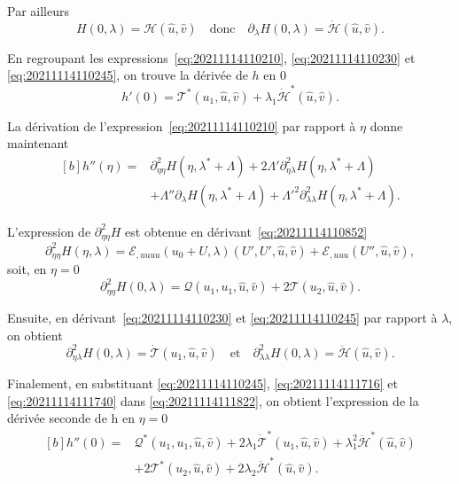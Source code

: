 \documentclass[12pt, final]{amsart}
\begin{document}
Par ailleurs
\begin{equation}
  \label{eq:20211114110245}
  H(0, \lambda)=\mathcal H(\hat{u}, \hat{v})
  \quad\text{donc}\quad
  \partial_\lambda H(0, \lambda)=\dot{\mathcal H}(\hat{u}, \hat{v}).
\end{equation}

En regroupant les expressions~\eqref{eq:20211114110210},
\eqref{eq:20211114110230} et \eqref{eq:20211114110245}, on trouve la dérivée de
\(h\) en 0
\begin{equation}
  h'(0)=\mathcal T^\ast(u_1, \hat{u}, \hat{v})
  +\lambda_1\dot{\mathcal H}^\ast(\hat{u}, \hat{v}).
\end{equation}

La dérivation de l'expression~\eqref{eq:20211114110210} par rapport à \(\eta\)
donne maintenant
\begin{equation}
  \label{eq:20211114111822}
  \begin{aligned}[b]
    h''(\eta)={}&\partial_{\eta\eta}^2 H(\eta, \lambda^\ast+\Lambda)
    +2\Lambda'\partial_{\eta\lambda}^2 H(\eta, \lambda^\ast+\Lambda)\\
    &+\Lambda''\partial_{\lambda}H(\eta, \lambda^\ast+\Lambda)
    +\Lambda'^2\partial_{\lambda\lambda}^2H(\eta, \lambda^\ast+\Lambda).
  \end{aligned}
\end{equation}

L'expression de \(\partial_{\eta\eta}^2H\) est obtenue en
dérivant~\eqref{eq:20211114110852}
\begin{equation}
  \partial_{\eta\eta}^2H(\eta, \lambda)
  =\mathcal E_{,uuuu}(u_0+U, \lambda)(U', U', \hat{u}, \hat{v})
  +\mathcal E_{,uuu}(U'', \hat{u}, \hat{v}),
\end{equation}
soit, en \(\eta=0\)
\begin{equation}
  \label{eq:20211114111716}
  \partial_{\eta\eta}^2H(0, \lambda)=\mathcal Q(u_1, u_1, \hat{u}, \hat{v})
  +2\mathcal T(u_2, \hat{u}, \hat{v}).
\end{equation}

Ensuite, en dérivant~\eqref{eq:20211114110230} et \eqref{eq:20211114110245} par
rapport à \(\lambda\), on obtient
\begin{equation}
  \label{eq:20211114111740}
  \partial_{\eta\lambda}^2H(0, \lambda)=\dot{\mathcal T}(u_1, \hat{u}, \hat{v})
  \quad\text{et}\quad
  \partial_{\lambda\lambda}^2H(0, \lambda)=\ddot{\mathcal H}(\hat{u}, \hat{v}).
\end{equation}

Finalement, en substituant \eqref{eq:20211114110245}, \eqref{eq:20211114111716}
et \eqref{eq:20211114111740} dans \eqref{eq:20211114111822}, on obtient
l'expression de la dérivée seconde de h en \(\eta=0\)
\begin{equation}
  \begin{aligned}[b]
    h''(0)={}&\mathcal Q^\ast(u_1, u_1, \hat{u}, \hat{v})
    +2\lambda_1\dot{\mathcal T}^\ast(u_1, \hat{u}, \hat{v})
    +\lambda_1^2\ddot{\mathcal H}^\ast(\hat{u}, \hat{v})\\
    &+2\mathcal T^\ast(u_2, \hat{u}, \hat{v})
    +2\lambda_2\dot{\mathcal H}^\ast(\hat{u}, \hat{v}).
  \end{aligned}
\end{equation}
\end{document}
